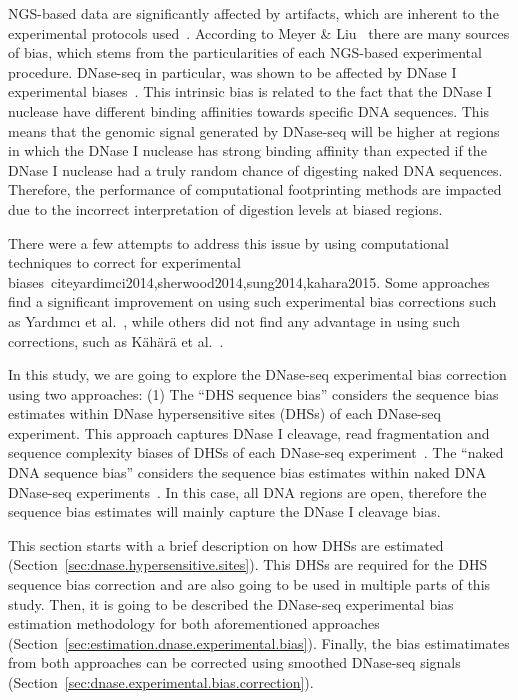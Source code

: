 NGS-based data are significantly affected by artifacts, which are inherent to the experimental protocols used~\cite{he2014,yardimci2014,meyer2014}. According to Meyer \& Liu~\cite{meyer2014} there are many sources of bias, which stems from the particularities of each NGS-based experimental procedure. DNase-seq in particular, was shown to be affected by DNase I experimental biases~\cite{he2014}. This intrinsic bias is related to the fact that the DNase I nuclease have different binding affinities towards specific DNA sequences. This means that the genomic signal generated by DNase-seq will be higher at regions in which the DNase I nuclease has strong binding affinity than expected if the DNase I nuclease had a truly random chance of digesting naked DNA sequences. Therefore, the performance of computational footprinting methods are impacted due to the incorrect interpretation of digestion levels at biased regions.

There were a few attempts to address this issue by using computational techniques to correct for experimental biases~cite{yardimci2014,sherwood2014,sung2014,kahara2015}. Some approaches find a significant improvement on using such experimental bias corrections such as Yard{\i}mc{\i} et al.~\cite{yardimci2014}, while others did not find any advantage in using such corrections, such as K\"{a}h\"{a}r\"{a} et al.~\cite{kahara2015}.

In this study, we are going to explore the DNase-seq experimental bias correction using two approaches: (1) The ``DHS sequence bias'' considers the sequence bias estimates within DNase hypersensitive sites (DHSs) of each DNase-seq experiment. This approach captures DNase I cleavage, read fragmentation and sequence complexity biases of DHSs of each DNase-seq experiment~\cite{he2014}. The ``naked DNA sequence bias'' considers the sequence bias estimates within naked DNA DNase-seq experiments~\cite{yardimci2014}. In this case, all DNA regions are open, therefore the sequence bias estimates will mainly capture the DNase I cleavage bias.

This section starts with a brief description on how DHSs are estimated (Section~\ref{sec:dnase.hypersensitive.sites}). This DHSs are required for the DHS sequence bias correction and are also going to be used in multiple parts of this study. Then, it is going to be described the DNase-seq experimental bias estimation methodology for both aforementioned approaches (Section~\ref{sec:estimation.dnase.experimental.bias}). Finally, the bias estimatimates from both approaches can be corrected using smoothed DNase-seq signals (Section~\ref{sec:dnase.experimental.bias.correction}).



